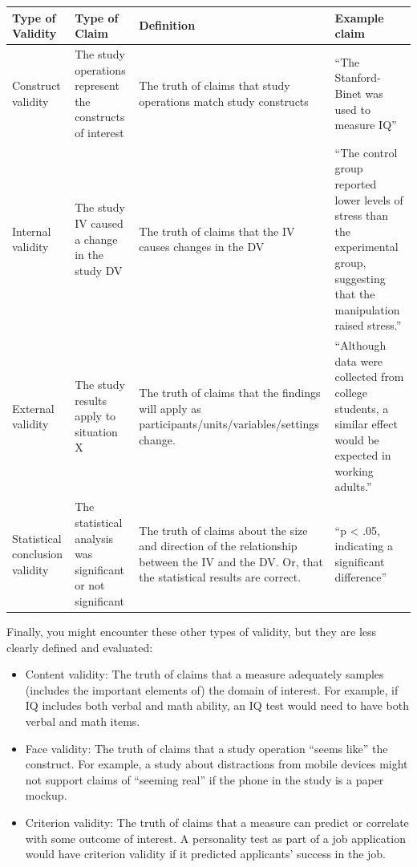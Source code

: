 \documentclass[
]{book}
\providecommand{\tightlist}{%
  \setlength{\itemsep}{0pt}\setlength{\parskip}{0pt}}
\begin{document}
\begin{longtable}[]{@{}
  >{\raggedright\arraybackslash}p{}
  >{\raggedright\arraybackslash}p{}
  >{\raggedright\arraybackslash}p{}
  >{\raggedright\arraybackslash}p{}@{}}
\toprule
Type of Validity & Type of Claim & Definition & Example claim \\
\midrule
\endhead
Construct validity & The study operations represent the constructs of interest & The truth of claims that study operations match study constructs & ``The Stanford-Binet was used to measure IQ'' \\
Internal validity & The study IV caused a change in the study DV & The truth of claims that the IV causes changes in the DV & ``The control group reported lower levels of stress than the experimental group, suggesting that the manipulation raised stress.'' \\
External validity & The study results apply to situation X & The truth of claims that the findings will apply as participants/units/variables/settings change. & ``Although data were collected from college students, a similar effect would be expected in working adults.'' \\
Statistical conclusion validity & The statistical analysis was significant or not significant & The truth of claims about the size and direction of the relationship between the IV and the DV. Or, that the statistical results are correct. & ``p \textless{} .05, indicating a significant difference'' \\
\bottomrule
\end{longtable}

Finally, you might encounter these other types of validity, but they are less clearly defined and evaluated:

\begin{itemize}
\tightlist
\item
  Content validity: The truth of claims that a measure adequately samples (includes the important elements of) the domain of interest. For example, if IQ includes both verbal and math ability, an IQ test would need to have both verbal and math items.
\item
  Face validity: The truth of claims that a study operation ``seems like'' the construct. For example, a study about distractions from mobile devices might not support claims of ``seeming real'' if the phone in the study is a paper mockup.
\item
  Criterion validity: The truth of claims that a measure can predict or correlate with some outcome of interest. A personality test as part of a job application would have criterion validity if it predicted applicants' success in the job.
\end{itemize}
\end{document}
